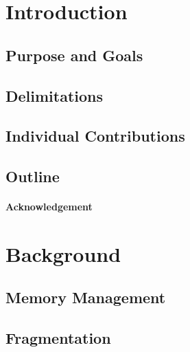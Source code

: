 \documentclass[a4paper,12pt]{article}
\begin{document}
\cleardoublepage

\mainmatter


\section{Introduction}
\label{sec:introduction}


\newpage

\subsection{Purpose and Goals}
\label{sec:purpose}


\subsection{Delimitations}
\label{sec:delimitations}


\subsection{Individual Contributions}
\label{sec:individual_contrubitons}


\subsection{Outline}
\label{sec:outline}


\paragraph{Acknowledgement}


\newpage
\section{Background}
\label{sec:background}


\subsection{Memory Management}
\label{sec:memory_management}


\subsection{Fragmentation}
\label{sec:fragmentation}

\end{document}
